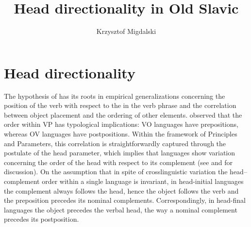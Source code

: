 \documentclass[output=paper,modfonts,newtxmath,hidelinks]{langscibook}
\title{Head directionality in Old Slavic}
\author{Krzysztof Migdalski\affiliation{University of Wrocław}}
\begin{document}
\maketitle


\section{Head directionality}\label{11:s1}

The hypothesis of  has its roots in  empirical generalizations concerning the position of the verb with respect to the  in the verb phrase and the correlation between object placement and the ordering of other elements. \citeauthor{greenberg1963} observed that the order within VP has typological implications: VO languages have prepositions, whereas OV languages have postpositions. Within the framework of Principles and Parameters, this correlation is straightforwardly captured through the postulate of the head parameter, which implies that languages show variation concerning the order of the head with respect to its complement (see \citealt{Vennemann1972} and \citealt{Dryer1992,Dryer2007} for discussion). On the assumption that in spite of crosslinguistic variation the head--complement order within a single language is invariant, in head-initial languages the complement always follows the head, hence the object follows the verb and the preposition precedes its nominal complements. Correspondingly, in head-final languages the object precedes the verbal head, the way a nominal complement precedes its postposition.
\end{document}
